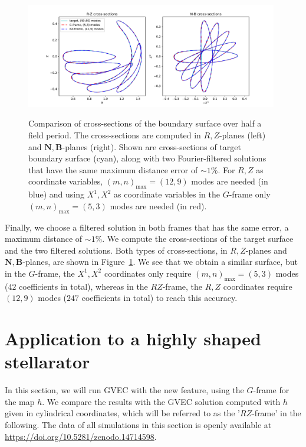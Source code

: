 \documentclass[12pt]{iopart}
\newcommand\hladdedrev[1]{#1} %
\newcommand\hlchangedrev[1]{#1} %
\newcommand\Nnew{{\bm N}}
\newcommand\Bnew{{\bm B}}
\newcommand\hmap{{h}}
\newcommand\GFF{$G$-frame}
\newcommand\RZF{$RZ$-frame}
\newcommand\RZplanes[1]{$R,Z$-planes{#1}}
\newcommand\NBplanes[1]{$\Nnew,\Bnew$-planes{#1}}
\begin{document}
\begin{figure}[htbp!]
    \centering
    \includegraphics[trim=40 10 80 20,clip,width=0.98\textwidth]{pics/quasr/quasr_cross_sections_RZ_NB_maxdist_1percent.pdf}\\
    \caption{\hladdedrev{Comparison of cross-sections of the boundary surface over half a field period. The cross-sections are computed in  \RZplanes{ } (left) and \NBplanes{ }  (right). Shown are cross-sections of target boundary surface (cyan), along with two  Fourier-filtered solutions that have the same maximum distance error of $\sim1\%$. For $R,Z$ as coordinate variables, $(m,n)_\text{max}=(12,9)$ modes are needed (in blue) and using $X^1,X^2$ as coordinate variables in the \GFF{} only $(m,n)_\text{max}=(5,3)$ modes are needed (in red).}}
    \label{fig:quasr_cross_sections_maxdist}
\end{figure}

\hladdedrev{
Finally, we choose a filtered solution in both frames that has the same error, a maximum distance of $\sim 1 \%$. We compute the cross-sections of the target surface and the two filtered solutions. Both types of cross-sections, in  \RZplanes{ }  and \NBplanes{}, are shown in Figure~\ref{fig:quasr_cross_sections_maxdist}. We see that we obtain a similar surface, but in the \GFF{}, the $X^1,X^2$ coordinates only require $(m,n)_\text{max}=(5,3)$ modes ($42$ coefficients in total), whereas in the \RZF{}, the $R,Z$ coordinates require $(12,9)$ modes ($247$ coefficients in total) to reach this accuracy. 
}


    
\section{Application to a highly shaped stellarator \label{sec:results}}
In this section, we will run GVEC with the new feature, using the \GFF{} for the map $\hmap$. We compare the results with the GVEC solution computed with $\hmap$ given in cylindrical coordinates, which will be referred to as the '\RZF{}' in the following. 
The data of all simulations in this section is openly available at \hlchangedrev{\url{https://doi.org/10.5281/zenodo.14714598}}.
\end{document}
